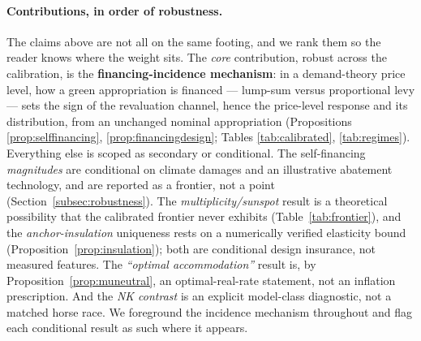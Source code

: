 \documentclass[12pt]{article}
\begin{document}
\paragraph{Contributions, in order of robustness.} The claims above are not
all on the same footing, and we rank them so the reader knows where the weight
sits. The \emph{core} contribution, robust across the calibration, is the
\textbf{financing-incidence mechanism}: in a demand-theory price level, how a
green appropriation is financed --- lump-sum versus proportional levy --- sets
the sign of the revaluation channel, hence the price-level response and its
distribution, from an unchanged nominal appropriation (Propositions
\ref{prop:selffinancing}, \ref{prop:financingdesign}; Tables
\ref{tab:calibrated}, \ref{tab:regimes}). Everything else is scoped as
secondary or conditional. The self-financing \emph{magnitudes} are conditional
on climate damages and an illustrative abatement technology, and are reported
as a frontier, not a point (Section~\ref{subsec:robustness}). The
\emph{multiplicity/sunspot} result is a theoretical possibility that the
calibrated frontier never exhibits (Table~\ref{tab:frontier}), and the
\emph{anchor-insulation} uniqueness rests on a numerically verified elasticity
bound (Proposition~\ref{prop:insulation}); both are conditional design
insurance, not measured features. The \emph{``optimal accommodation''} result
is, by Proposition~\ref{prop:muneutral}, an optimal-real-rate statement, not an
inflation prescription. And the \emph{NK contrast} is an explicit model-class
diagnostic, not a matched horse race. We foreground the incidence mechanism
throughout and flag each conditional result as such where it appears.
\end{document}

